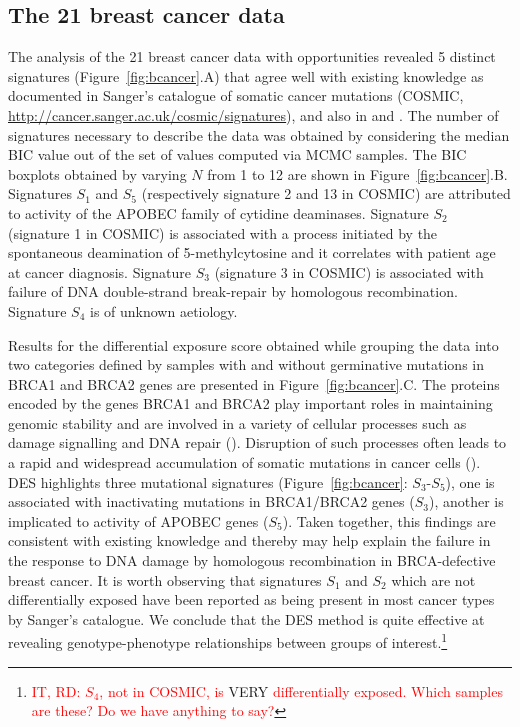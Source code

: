 \documentclass{bioinfo}
\begin{document}
\subsection{The 21 breast cancer data}
The analysis of the 21 breast cancer data with opportunities revealed
5 distinct signatures (Figure~\ref{fig:bcancer}.A) that agree well
with existing knowledge as documented in Sanger's catalogue of
somatic cancer mutations (COSMIC, 
\url{http://cancer.sanger.ac.uk/cosmic/signatures}), and also in
\cite{HEN} and \cite{ANat}. The number of signatures necessary to
describe the data was obtained by considering the median BIC value out
of the set of values computed via MCMC samples. The BIC boxplots
obtained by varying $N$ from 1 to 12 are shown in
Figure~\ref{fig:bcancer}.B. Signatures $S_1$ and $S_5$ (respectively
signature 2 and 13 in COSMIC) are attributed to activity of the APOBEC
family of cytidine deaminases.  Signature $S_2$ (signature 1 in
COSMIC) is associated with a process initiated by the spontaneous
deamination of 5-methylcytosine and it correlates with patient age at
cancer diagnosis. Signature $S_3$ (signature 3 in COSMIC) is
associated with failure of DNA double-strand break-repair by
homologous recombination. Signature $S_4$ is of unknown aetiology. 

Results for the differential exposure score obtained while grouping
the data into two categories defined by samples with and without
germinative mutations in BRCA1 and BRCA2 genes are presented in
Figure~\ref{fig:bcancer}.C. The proteins encoded by the genes BRCA1
and BRCA2 play important roles in maintaining genomic stability and
are involved in a variety of cellular processes such as damage
signalling and DNA repair (\citealp{LY}). Disruption of such processes
often leads to a rapid and widespread accumulation of somatic
mutations in cancer cells (\citealp{Ash}). DES highlights three
mutational signatures (Figure~\ref{fig:bcancer}: $S_3$-$S_5$), one is
associated with inactivating mutations in BRCA1/BRCA2 genes ($S_{3}$),
another is implicated to activity of APOBEC genes ($S_5$). Taken
together, this findings are consistent with existing knowledge and
thereby may help explain the failure in the response to DNA damage by
homologous recombination in BRCA-defective breast cancer. It is worth
observing that signatures $S_1$ and $S_2$ which are not differentially
exposed have been reported as being present in most cancer types by
Sanger's catalogue. We conclude that the DES method is quite effective
at revealing genotype-phenotype relationships between groups of
interest.\footnote{\textcolor{red}{IT, RD: $S_4$, not in COSMIC, is}
VERY \textcolor{red}{differentially exposed. Which samples are these?
Do we have anything to say?}}
\end{document}
